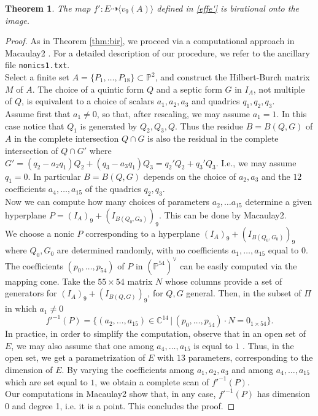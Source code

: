 \documentclass{amsart}
\newcommand{\C}{\mathbb{C}}
\newcommand{\Pj}{\mathbb{P}}
\newtheorem{thm0}{Theorem}[section]
\theoremstyle{definition}
\begin{document}
 \begin{thm0}\label{bir17}
The map $f' : E \dasharrow \langle v_9(A) \rangle $ defined in \eqref{effe'} is birational onto the image.
\end{thm0}
  \begin{proof}
As in Theorem \ref{thm:bir}, we proceed via a computational approach in Macaulay2 \cite{Macaulay2}. 
For a detailed description of our procedure, we refer to the ancillary file \texttt{nonics1.txt}. \\
Select a finite set $ A = \{P_1,\ldots,P_{18}\} \subset \Pj^2 $, and construct the Hilbert-Burch matrix $M$ of $ A $.
The choice of a quintic form $Q $ and a septic form $G$ in $ I_{A} $, not multiple of $Q$,
is equivalent to a choice of scalars $a_1,a_2,a_3$ and quadrics $q_1,q_2,q_3$.\\
Assume first that $a_1\neq 0$, so that, after rescaling, 
we may assume $a_1=1$.
In this case notice that $Q_1$ is generated by $Q_2,Q_3,Q$. Thus the residue  $B=B(Q,G)$ of $A$ in the complete intersection $Q\cap G$
is also the residual in the complete intersection of $Q\cap G'$ where $G'=(q_2-a_2q_1)Q_2+(q_3-a_3q_1)Q_3=q_2'Q_2+q_3'Q_3$. I.e., we may assume $q_1=0$.
 In particular $B=B(Q,G)$ depends on the choice of $a_2,a_3$ and the $12$ coefficients $ a_4,\dots,a_{15}$ of the quadrics $q_2,q_3$.\\
 Now we can compute how many choices of parameters $a_2,\dots a_{15}$ determine a given hyperplane $P=(I_A)_9+ (I_{B(Q_0,G_0)})_9$. 
 This can be done by Macaulay2. \\
We choose a nonic $P$ corresponding to a hyperplane $ (I_{A})_{9}+ (I_{B(Q_0,G_0)})_{9} $ where $Q_0,G_0$ are determined randomly, 
 with no coefficients $a_1,\dots,a_{15}$ equal to $0$. The coefficients $(p_0,\dots,p_{54})$ of $P$ in  $(\Pj^{54})^\vee$ can be easily computed via
 the mapping cone. Take the $ 55\times 54 $ matrix $N$ whose columns provide a set of generators  
for $ (I_{A})_{9}+ (I_{B(Q,G)})_{9} $, for $Q,G$ general. Then, in the subset of $\Pi$ in which $a_1\neq 0$
\begin{equation}\label{eq:sys'}
{f'}^{-1}(P) = \{(a_2, \ldots, a_{15}) \in \C^{14} \, | \, (p_0, \ldots, p_{54})\cdot N = 0_{1 \times 54}\}. 
\end{equation}
In practice, in order to simplify the computation, observe that in an open set of $E$, we may also assume that one among
$a_4,\dots,a_{15}$ is equal to $1$ . Thus, in the open set,  we get a parametrization of  $E$
with $13$ parameters, corresponding to the dimension of $E$. By varying the coefficients among $a_1,a_2,a_3$ and among  $a_4, \dots, a_{15}$
 which are set equal to $1$, we obtain a complete scan of $f'^{-1}(P)$.\\
Our  computations in Macaulay2 show that, in any case, $ f'^{-1}(P) $ has dimension $ 0 $ and degree 1, i.e. it is a point.%
This concludes the proof.
  \end{proof}  
\end{document}
